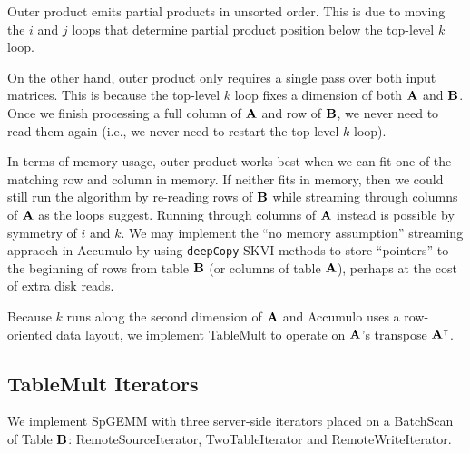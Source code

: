 Outer product emits partial products in unsorted order.
This is due to moving the $i$ and $j$ loops
that determine partial product position
below the top-level $k$ loop.

On the other hand, outer product only requires a single pass over both input matrices.
This is because the top-level $k$ loop fixes a dimension of both $\mathbf{A}$ and $\mathbf{B}$.
Once we finish processing a full column of $\mathbf{A}$ and row of $\mathbf{B}$,
we never need to read them again (i.e., we never need to restart the top-level $k$ loop).

In terms of memory usage, outer product works best when we can fit one of the matching row and column in memory.
If neither fits in memory, then we could still run the algorithm by
re-reading rows of $\mathbf{B}$ while streaming through columns of $\mathbf{A}$ as the loops suggest.
Running through columns of $\mathbf{A}$ instead is possible by symmetry of $i$ and $k$.
We may implement the ``no memory assumption'' streaming appraoch in Accumulo by using
\texttt{deepCopy} SKVI methods to store ``pointers'' to the beginning of rows from table $\mathbf{B}$
(or columns of table $\mathbf{A}$),
perhaps at the cost of extra disk reads.

Because $k$ runs along the second dimension of $\mathbf{A}$
and Accumulo uses a row-oriented data layout, we implement 
TableMult to operate on $\mathbf{A}$'s transpose $\mathbf{A^{\intercal}}$.



\subsection{TableMult Iterators}
\label{sTableMult}


We implement SpGEMM with three server-side iterators placed on a BatchScan of Table $\mathbf{B}$:
RemoteSourceIterator, TwoTableIterator and RemoteWriteIterator.

